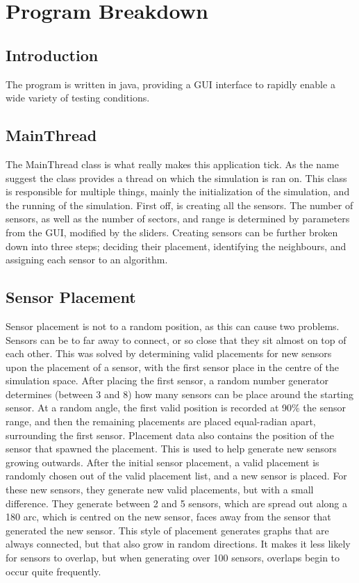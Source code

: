 \section{Program Breakdown}

\subsection{Introduction}
The program is written in java, providing a GUI interface to rapidly enable a wide variety of testing conditions. 

\subsection{MainThread}

The MainThread class is what really makes this application tick. As the name suggest the 
class provides a thread on which the simulation is ran on. This class is responsible for 
multiple things, mainly the initialization of the simulation, and the running of the 
simulation. First off, is creating all the sensors. The number of sensors, as well as the 
number of sectors, and range is determined by parameters from the GUI, modified by the 
sliders. Creating sensors can be further broken down into three steps;  deciding their 
placement, identifying the neighbours, and assigning each sensor to an algorithm. 
	
\subsection{Sensor Placement}

Sensor placement is not to a random position, as this can cause two problems. Sensors can be 
to far away to connect, or so close that they sit almost on top of each other. This was solved 
by determining valid placements for new sensors upon the placement of a sensor, with the first 
sensor place in the centre of the simulation space. After placing the first sensor, a random 
number generator determines (between 3 and 8) how many sensors can be place around the 
starting sensor. At a random angle, the first valid position is recorded at 90\% the sensor 
range, and then the remaining placements are placed equal-radian apart, surrounding the first 
sensor. Placement data also contains the position of the sensor that spawned the placement. 
This is used to help generate new sensors growing outwards. After the initial sensor 
placement, a valid placement is randomly chosen out of the valid placement list, and a new 
sensor is placed. For these new sensors, they generate new valid placements, but with a small 
difference. They generate between 2 and 5 sensors, which are spread out along a 180 arc, which 
is centred on the new sensor, faces away from the sensor that generated the new sensor. This 
style of placement generates graphs that are always connected, but that also grow in random 
directions. It makes it less likely for sensors to overlap, but when generating over 100 
sensors, overlaps begin to occur quite frequently.

